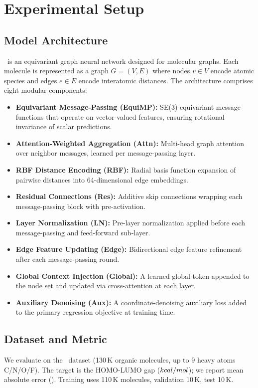 \section{Experimental Setup}

\subsection{Model Architecture}
\modelname\ is an equivariant graph neural network designed for molecular graphs. Each
molecule is represented as a graph \(G = (V, E)\) where nodes \(v \in V\) encode atomic
species and edges \(e \in E\) encode interatomic distances. The architecture comprises
eight modular components:

\begin{itemize}[nosep,leftmargin=*,itemsep=1pt]
  \item \textbf{Equivariant Message-Passing (EquiMP):} SE(3)-equivariant message functions
        that operate on vector-valued features, ensuring rotational invariance of scalar
        predictions.
  \item \textbf{Attention-Weighted Aggregation (Attn):} Multi-head graph attention over
        neighbor messages, learned per message-passing layer.
  \item \textbf{RBF Distance Encoding (RBF):} Radial basis function expansion of
        pairwise distances into 64-dimensional edge embeddings.
  \item \textbf{Residual Connections (Res):} Additive skip connections wrapping each
        message-passing block with pre-activation.
  \item \textbf{Layer Normalization (LN):} Pre-layer normalization applied before each
        message-passing and feed-forward sub-layer.
  \item \textbf{Edge Feature Updating (Edge):} Bidirectional edge feature refinement
        after each message-passing round.
  \item \textbf{Global Context Injection (Global):} A learned global token appended to the
        node set and updated via cross-attention at each layer.
  \item \textbf{Auxiliary Denoising (Aux):} A coordinate-denoising auxiliary loss
        added to the primary regression objective at training time.
\end{itemize}

\subsection{Dataset and Metric}
We evaluate on the \dataset\ dataset (130\,K organic molecules, up to 9 heavy atoms
C/N/O/F). The target is the HOMO-LUMO gap (\(kcal/mol\)); we report mean absolute
error (\metric). Training uses 110\,K molecules, validation 10\,K, test 10\,K.


